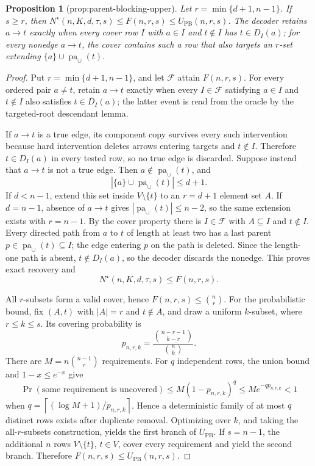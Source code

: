 \documentclass{article}
\newtheorem{proposition}{Proposition}
\begin{document}
\begin{proposition}[prop:parent-blocking-upper]\label{prop:parent-blocking-upper}
Let \(r=\min\{d+1,n-1\}\). If \(s\ge r\), then \(N^{\star}(n,K,d,\tau,s)\le F(n,r,s)\le U_{\mathrm{PB}}(n,r,s)\). The decoder retains \(a\to t\) exactly when every cover row \(I\) with \(a\in I\) and \(t\notin I\) has \(t\in D_I(a)\); for every nonedge \(a\to t\), the cover contains such a row that also targets an \(r\)-set extending \(\{a\}\cup\operatorname{pa}_{\cup}(t)\).
\end{proposition}
\begin{proof}
Put \(r=\min\{d+1,n-1\}\), and let \(\mathcal F\) attain \(F(n,r,s)\). For every ordered pair \(a\ne t\), retain \(a\to t\) exactly when every \(I\in\mathcal F\) satisfying \(a\in I\) and \(t\notin I\) also satisfies \(t\in D_I(a)\); the latter event is read from the oracle by the targeted-root descendant lemma.

If \(a\to t\) is a true edge, its component copy survives every such intervention because hard intervention deletes arrows entering targets and \(t\notin I\). Therefore \(t\in D_I(a)\) in every tested row, so no true edge is discarded. Suppose instead that \(a\to t\) is not a true edge. Then \(a\notin\operatorname{pa}_{\cup}(t)\), and
\[
 |\{a\}\cup\operatorname{pa}_{\cup}(t)|\le d+1.
\]
If \(d<n-1\), extend this set inside \(V\setminus\{t\}\) to an \(r=d+1\) element set \(A\). If \(d=n-1\), absence of \(a\to t\) gives \(|\operatorname{pa}_{\cup}(t)|\le n-2\), so the same extension exists with \(r=n-1\). By the cover property there is \(I\in\mathcal F\) with \(A\subseteq I\) and \(t\notin I\). Every directed path from \(a\) to \(t\) of length at least two has a last parent \(p\in\operatorname{pa}_{\cup}(t)\subseteq I\); the edge entering \(p\) on the path is deleted. Since the length-one path is absent, \(t\notin D_I(a)\), so the decoder discards the nonedge. This proves exact recovery and
\[
 N^{\star}(n,K,d,\tau,s)\le F(n,r,s).
\]

All \(r\)-subsets form a valid cover, hence \(F(n,r,s)\le\binom nr\). For the probabilistic bound, fix \((A,t)\) with \(|A|=r\) and \(t\notin A\), and draw a uniform \(k\)-subset, where \(r\le k\le s\). Its covering probability is
\[
 p_{n,r,k}=\frac{\binom{n-r-1}{k-r}}{\binom nk}.
\]
There are \(M=n\binom{n-1}{r}\) requirements. For \(q\) independent rows, the union bound and \(1-x\le e^{-x}\) give
\[
 \Pr(\text{some requirement is uncovered})
 \le M(1-p_{n,r,k})^q
 \le M e^{-q p_{n,r,k}}<1
\]
when \(q=\left\lceil(\log M+1)/p_{n,r,k}\right\rceil\). Hence a deterministic family of at most \(q\) distinct rows exists after duplicate removal. Optimizing over \(k\), and taking the all-\(r\)-subsets construction, yields the first branch of \(U_{\mathrm{PB}}\). If \(s=n-1\), the additional \(n\) rows \(V\setminus\{t\}\), \(t\in V\), cover every requirement and yield the second branch. Therefore \(F(n,r,s)\le U_{\mathrm{PB}}(n,r,s)\).
\end{proof}
\end{document}
